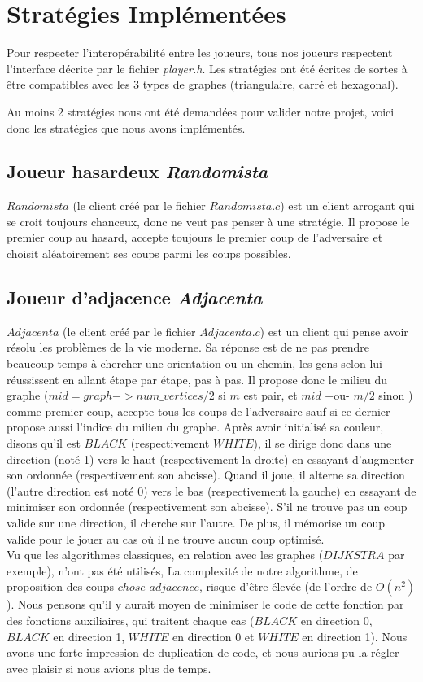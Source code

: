 \documentclass{article}
\begin{document}
\section{Stratégies Implémentées}
Pour respecter l'interopérabilité entre les joueurs, tous nos joueurs respectent l'interface décrite par le fichier \textit{player.h}.
Les stratégies ont été écrites de sortes à être compatibles avec les 3 types de graphes (triangulaire, carré et hexagonal).

Au moins 2 stratégies nous ont été demandées pour valider notre projet, voici donc les stratégies que nous avons implémentés.

\subsection{Joueur hasardeux \textit{Randomista}}
 $Randomista$ (le client créé par le fichier $Randomista.c$) est un client arrogant qui se croit toujours chanceux, donc ne veut pas penser à une stratégie. Il propose le premier coup au hasard, accepte toujours le premier coup de l'adversaire et choisit aléatoirement ses coups parmi les coups possibles.
 \subsection{Joueur d'adjacence \textit{Adjacenta}}
 $Adjacenta$ (le client créé par le fichier $Adjacenta.c$) est un client qui pense avoir résolu les problèmes de la vie moderne. Sa réponse est de ne pas prendre beaucoup temps à chercher une orientation ou un chemin, les gens selon lui réussissent en allant étape par étape, pas à pas. Il propose donc le milieu du graphe ($mid = graph->num\_vertices / 2$ si $m$ est pair, et $mid$ +ou- $m/2$ sinon ) comme premier coup, accepte tous les coups de l'adversaire sauf si ce dernier propose aussi l'indice du milieu du graphe. Après avoir initialisé sa couleur, disons qu'il est $BLACK$ (respectivement $WHITE$), il se dirige donc dans une direction (noté 1) vers le haut (respectivement la droite) en essayant d'augmenter son ordonnée (respectivement son abcisse). Quand il joue, il alterne sa direction (l'autre direction est noté 0) vers le bas (respectivement la gauche) en essayant de minimiser son ordonnée (respectivement son abcisse). S'il ne trouve pas un coup valide sur une direction, il cherche sur l'autre. De plus, il mémorise un coup valide pour le jouer au cas o\`u il ne trouve aucun coup optimisé.\\
 Vu que les algorithmes classiques, en relation avec les graphes ($DIJKSTRA$ par exemple), n'ont pas été utilisés, La complexité de notre algorithme, de proposition des coups $chose\_adjacence$, risque d'être élevée (de l'ordre de $O(n^2)$ ). Nous pensons qu'il y aurait moyen de minimiser le code de cette fonction par des fonctions auxiliaires, qui traitent chaque cas ($BLACK$ en direction 0, $BLACK$ en direction 1, $WHITE$ en direction 0 et $WHITE$ en direction 1). Nous avons une forte impression de duplication de code, et nous aurions pu la régler avec plaisir si nous avions plus de temps.
 
\end{document}
